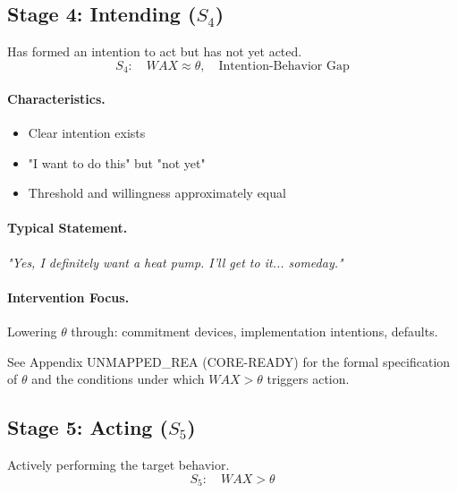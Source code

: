 \subsection{Stage 4: Intending ($S_4$)}
\label{sec:bcj-s4}

\begin{definition}
Has formed an intention to act but has not yet acted.
\begin{equation}
S_4: \quad WAX \approx \theta, \quad \text{Intention-Behavior Gap}
\end{equation}
\end{definition}

\paragraph{Characteristics.}
\begin{itemize}
    \item Clear intention exists
    \item "I want to do this" but "not yet"
    \item Threshold and willingness approximately equal
\end{itemize}

\paragraph{Typical Statement.}
\textit{"Yes, I definitely want a heat pump. I'll get to it... someday."}

\paragraph{Intervention Focus.}
Lowering $\theta$ through: commitment devices, implementation intentions, defaults.

\begin{cross-reference}
See Appendix UNMAPPED_REA (CORE-READY) for the formal specification of $\theta$
and the conditions under which $WAX > \theta$ triggers action.
\end{cross-reference}

\subsection{Stage 5: Acting ($S_5$)}
\label{sec:bcj-s5}

\begin{definition}
Actively performing the target behavior.
\begin{equation}
S_5: \quad WAX > \theta
\end{equation}
\end{definition}

